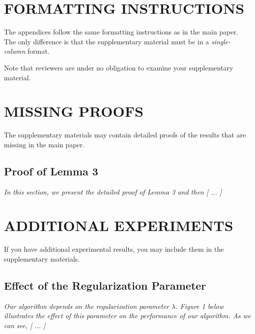 \section{FORMATTING INSTRUCTIONS}

The appendices follow the same formatting instructions as in the main paper.
The only difference is that the supplementary material must be in a \emph{single-column} format.

Note that reviewers are under no obligation to examine your supplementary material.

\section{MISSING PROOFS}

The supplementary materials may contain detailed proofs of the results that are missing in the main paper.

\subsection{Proof of Lemma 3}

\textit{In this section, we present the detailed proof of Lemma 3 and then [ ... ]}

\section{ADDITIONAL EXPERIMENTS}

If you have additional experimental results, you may include them in the supplementary materials.

\subsection{Effect of the Regularization Parameter}

\textit{Our algorithm depends on the regularization parameter $\lambda$. Figure 1 below illustrates the effect of this parameter on the performance of our algorithm. As we can see, [ ... ]}


